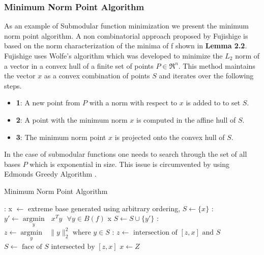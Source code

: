 \subsubsection{Minimum Norm Point Algorithm}
As an example of Submodular function minimization we present the minimum norm point algorithm. A non combinatorial approach proposed by Fujishige \cite{Fujishige} is based on the norm characterization of the minima of f shown in {\bf Lemma 2.2}. Fujishige uses Wolfe's algorithm \cite{Wolfe} which was developed to minimize the $L_2$ norm of a vector in a convex hull of a finite set of points $P \in \Re^n$. This method maintains the vector $x$ as a convex combination of points $S$ and iterates over the following steps.\\
\begin{itemize}
 \item {\bf 1}: A new point from $P$ with a norm with respect to $x$ is added to to set $S$.
 \item {\bf 2}: A point with the minimum norm $x$ is computed in the affine hull of $S$.
 \item {\bf 3}: The minimum norm point $x$ is projected onto the convex hull of $S$. 
\end{itemize}

In the case of submodular functions one needs to search through the set of all bases $P$ which is exponential in size. This issue is circumvented by using Edmonds Greedy Algorithm \cite{Edmond}.\\

\begin{algorithm}[htb]
\caption{Minimum Norm Point Algorithm}
\label{alg:min_norm_point}
\begin{algorithmic}[1]
\footnotesize
{}: x $\leftarrow$ extreme base generated using arbitrary ordering, $S \leftarrow \{x\}$
\Loop
  : $y' \leftarrow  \underset{y}{\operatorname{argmin }}\text{ } x^Ty \text{ } \forall y\in B(f)$
 x
\Else
$S \leftarrow S \cup \{y'\}$
\EndIf
{}: $z \leftarrow  \underset{y}{\operatorname{argmin }}\text{ } {\|y\|_2^2 \text{ where } y\in S}$
: 
               \State $z \leftarrow \text{ intersection of } [z,x] \text{ and } S$
		\State $S \leftarrow \text{ face of $S$ intersected by } [z,x]$
\EndWhile
\State $x\leftarrow Z$
\EndLoop
\end{algorithmic}
\end{algorithm}